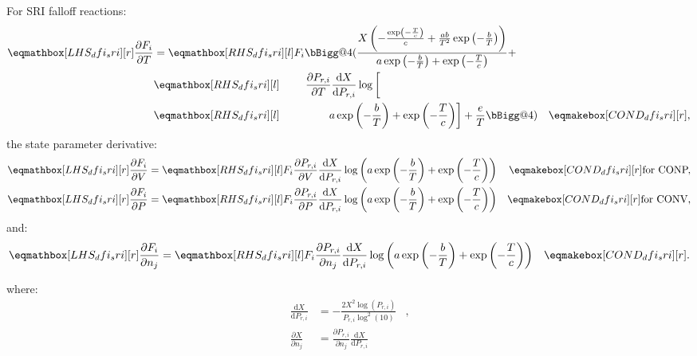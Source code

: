 \documentclass[12pt,number,sort&compress]{elsarticle}
\makeatletter
\newcommand{\conp}{CONP}
\newcommand{\conv}{CONV}
\newcommand{\dconp}{\ifmmode\text{for \conp,}\else for \conp,\fi}
\newcommand{\dconv}{\ifmmode\text{for \conv,}\else for \conv,\fi}
\newcommand{\vast}{\bBigg@{4}}
\makeatother
\begin{document}
For SRI falloff reactions:
\begin{align}
 \lhs{dfi_sri}{\frac{\partial F_{i} }{\partial T }} &= \rhs{dfi_sri}{F_{i} \vast(\frac{X \left(- \frac{\operatorname{exp}\left({- \frac{T}{c}}\right)}{c} + \frac{a b}{T^{2}} \operatorname{exp}\left({- \frac{b}{T}}\right)\right)}{a \operatorname{exp}\left({- \frac{b}{T}}\right) + \operatorname{exp}\left({- \frac{T}{c}}\right)} + } & \nonumber \\
 & \rhs{dfi_sri}{\mathindent \frac{\partial P_{r, i} }{\partial T } \frac{\text{d} X }{\text{d} P_{r, i} } \log{\biggl[}} & \nonumber \\
 & \rhs{dfi_sri}{\mathindent[largerstill] a \operatorname{exp}\left({- \frac{b}{T}}\right) + \operatorname{exp}\left({- \frac{T}{c}}\right) \biggr] + \frac{e}{T} \vast)} & \cond{dfi_sri}{,} \label{e:dfi_sri_dt}
\end{align}
the state parameter derivative:
\begin{subequations}
 \label{e:dfi_sri_de}
 \begin{align}
 \lhs{dfi_sri}{\frac{\partial F_{i} }{\partial V }} &= \rhs{dfi_sri}{F_{i} \frac{\partial P_{r, i} }{\partial V } \frac{\text{d} X }{\text{d} P_{r, i} } \log{\left (a \operatorname{exp}\left({- \frac{b}{T}}\right) + \operatorname{exp}\left({- \frac{T}{c}}\right) \right )}} & \cond{dfi_sri}{\dconp} \\
 \lhs{dfi_sri}{\frac{\partial F_{i} }{\partial P }} &= \rhs{dfi_sri}{F_{i} \frac{\partial P_{r, i} }{\partial P } \frac{\text{d} X }{\text{d} P_{r, i} } \log{\left (a \operatorname{exp}\left({- \frac{b}{T}}\right) + \operatorname{exp}\left({- \frac{T}{c}}\right) \right )}} & \cond{dfi_sri}{\dconv}
 \end{align}
\end{subequations}
and:
\begin{align}
 \lhs{dfi_sri}{\frac{\partial F_{i} }{\partial {n_j} }} &= \rhs{dfi_sri}{F_{i} \frac{\partial P_{r, i} }{\partial {n_j} } \frac{\text{d} X }{\text{d} P_{r, i} } \log{\left (a \operatorname{exp}\left({- \frac{b}{T}}\right) + \operatorname{exp}\left({- \frac{T}{c}}\right) \right )}} & \cond{dfi_sri}{.} \label{e:dfi_sri_dnj}
\end{align}

where:
\begin{align}
 \frac{\text{d} X }{\text{d} P_{r, i} } &= - \frac{2 X^{2} \log{\left (P_{r, i} \right )}}{P_{r, i} \log^{2}{\left (10 \right )}} &, \\
 \frac{\partial X}{\partial n_j} &= \frac{\partial P_{r, i} }{\partial {n_j} } \frac{\text{d} X }{\text{d} P_{r, i} }
\end{align}
\end{document}
